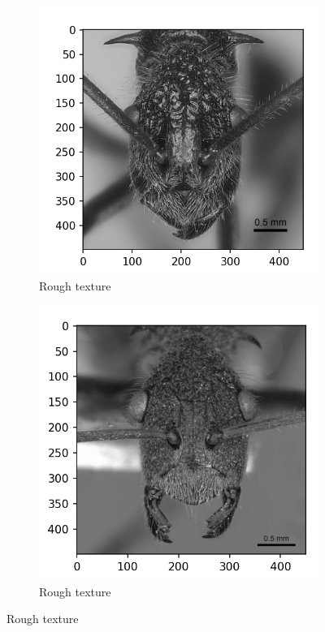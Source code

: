 \documentclass{aci}
\numberwithin{equation}{section}
\begin{document}
\newcommand{\segmentedsubwidth}{0.24\textwidth}
\begin{figure}
    \centering
    \begin{subfigure}{\segmentedsubwidth}
        \caption*{Rough texture}
        \includegraphics[width=1\linewidth]{figs/r103.png}
    \end{subfigure}
    \begin{subfigure}{\segmentedsubwidth}
        \caption*{Rough texture}
        \includegraphics[width=1\linewidth]{figs/r111.png}

\end{subfigure}
\end{figure}
\end{document}
